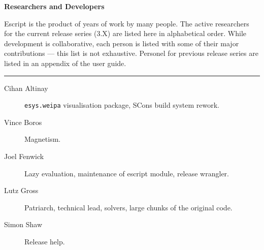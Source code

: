 \vbox{}
\vfill
\begin{center}
\textbf{\Large Researchers and Developers}
\vspace{0.5cm}

Escript is the product of years of work by many people.
The active researchers for the current release series (3.X) are listed here in alphabetical order.
While development is collaborative, each person is listed with some of their major contributions --- this list is not exhaustive.
Personel for previous release series are listed in an appendix of the user guide.

\vspace{1cm}
\hrule
\vspace{1cm}
\begin{description}
\item[Cihan Altinay] \texttt{esys.weipa} visualisation package, SCons build system rework.
\item[Vince Boros] Magnetism.
\item[Joel Fenwick] Lazy evaluation, maintenance of escript module, release wrangler.
\item[Lutz Gross] Patriarch, technical lead, solvers, large chunks of the original code.
\item[Simon Shaw] Release help.
\end{description}
\end{center}
\vfill
\pagebreak

